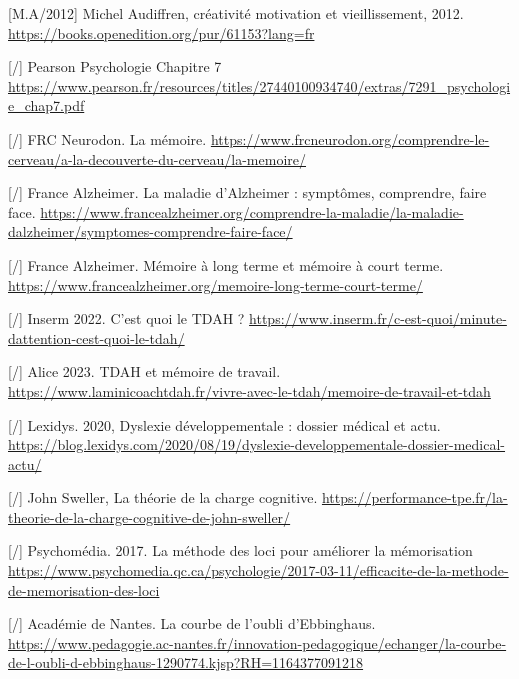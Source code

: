 \documentclass[11pt,a4paper]{report}
\begin{document}
\begin{thebibliography}{9}
        [M.A/2012] Michel Audiffren, créativité motivation et vieillissement, 2012. \break
        \url{https://books.openedition.org/pur/61153?lang=fr}

        [/] Pearson Psychologie Chapitre 7 \break
        \url{https://www.pearson.fr/resources/titles/27440100934740/extras/7291_psychologie_chap7.pdf}
     
        [/] FRC Neurodon. La mémoire. \break
        \url{https://www.frcneurodon.org/comprendre-le-cerveau/a-la-decouverte-du-cerveau/la-memoire/}
    
        [/] France Alzheimer. La maladie d'Alzheimer : symptômes, comprendre, faire face. \break
        \url{https://www.francealzheimer.org/comprendre-la-maladie/la-maladie-dalzheimer/symptomes-comprendre-faire-face/}
    
        [/] France Alzheimer. Mémoire à long terme et mémoire à court terme. \break
        \url{https://www.francealzheimer.org/memoire-long-terme-court-terme/}
    
        [/] Inserm 2022. C’est quoi le TDAH ? \break
        \url{https://www.inserm.fr/c-est-quoi/minute-dattention-cest-quoi-le-tdah/}
    
        [/] Alice 2023. TDAH et mémoire de travail. \break
        \url{https://www.laminicoachtdah.fr/vivre-avec-le-tdah/memoire-de-travail-et-tdah}
    
        [/] Lexidys. 2020, Dyslexie développementale : dossier médical et actu. \break
        \url{https://blog.lexidys.com/2020/08/19/dyslexie-developpementale-dossier-medical-actu/}
    
        [/] John Sweller, La théorie de la charge cognitive. \break
        \url{https://performance-tpe.fr/la-theorie-de-la-charge-cognitive-de-john-sweller/}

        [/] Psychomédia. 2017. La méthode des loci pour améliorer la mémorisation \break
        \url{https://www.psychomedia.qc.ca/psychologie/2017-03-11/efficacite-de-la-methode-de-memorisation-des-loci}
    
        [/] Académie de Nantes. La courbe de l'oubli d'Ebbinghaus. \break
        \url{https://www.pedagogie.ac-nantes.fr/innovation-pedagogique/echanger/la-courbe-de-l-oubli-d-ebbinghaus-1290774.kjsp?RH=1164377091218}
    

\end{thebibliography}
\end{document}
